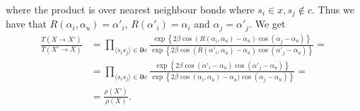 where the product is over nearest neighbour bonds where $s_i \in x, s_j \notin c$.
Thus we have that $ R(\alpha_i,\alpha_u) = \alpha'_i $, $R(\alpha'_i) = \alpha_i$ and $\alpha_j = \alpha'_j$.
We get
\begin{align}
  \frac{T(X\rightarrow X')}{T(X'\rightarrow X)}&= \prod_{\langle s_i s_j \rangle \in \bm{\partial} c} \frac{ \exp\left\{2\beta\cos(R(\alpha_i,\alpha_u) - \alpha_u)\cos(\alpha_j - \alpha_u)\right\}}{ \exp\left\{2\beta\cos(R(\alpha'_i,\alpha_u) - \alpha_u)\cos(\alpha'_j -\alpha_u)\right\}} = \\
  &= \prod_{\langle s_i s_j \rangle \in \bm{\partial} c} \frac{ \exp\left\{2\beta\cos(\alpha'_i - \alpha_u)\cos(\alpha'_j - \alpha_u)\right\}}{ \exp\left\{2\beta\cos(\alpha_i,\alpha_u) - \alpha_u)\cos(\alpha_j -\alpha_u)\right\}} = \\
  &= \frac{\rho(X')}{\rho(X)}.
\end{align}

